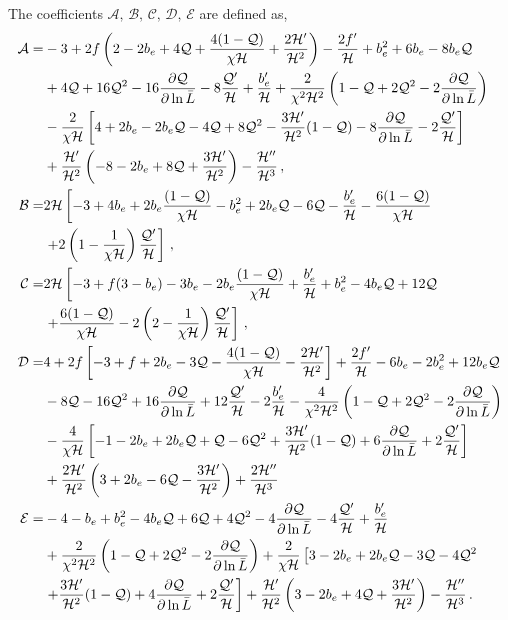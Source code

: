 The coefficients $\mathcal{A},\,\mathcal{B},\,\mathcal{C},\,\mathcal{D},\,\mathcal{E}$ are defined as, 
\begin{align}
	\mathcal{A} =& -3 + 2f \left(2 - 2b_e + 4 \mathcal{Q} + \frac{4(1-\mathcal{Q})}{\chi\mathcal{H}} + \frac{2\mathcal{H}'}{\mathcal{H}^{2}} \right) -\frac{2f'}{\mathcal{H}} + b_e^2 + 6 b_e - 8 b_e \mathcal{Q} \nonumber \\
	& + 4 \mathcal{Q} + 16 \mathcal{Q}^2 - 16\frac{\partial \mathcal{Q}}{\partial \ln\bar{L}} -8 \frac{\mathcal{Q}'}{\mathcal{H}} + \frac{b_e'}{\mathcal{H}} + \frac{2}{\chi^{2}\mathcal{H}^2} \left(1 - \mathcal{Q} + 2\mathcal{Q}^2 - 2\frac{\partial \mathcal{Q}}{\partial \ln{\bar{L}}} \right) \nonumber \\
	& - \frac{2}{\chi \mathcal{H}} \left[ 4 + 2b_e - 2 b_e \mathcal{Q} - 4\mathcal{Q} + 8\mathcal{Q}^2 - \frac{3\mathcal{H}'}{\mathcal{H}^2}(1 - \mathcal{Q}) - 8\frac{\partial \mathcal{Q}}{\partial \ln{\bar{L}}} - 2\frac{\mathcal{Q}'}{\mathcal{H}} \right] \nonumber \\
	& + \frac{\mathcal{H}'}{\mathcal{H}^2} \left(-8 - 2b_e + 8\mathcal{Q} + \frac{3\mathcal{H}'}{\mathcal{H}^2} \right) - \frac{\mathcal{H}''}{\mathcal{H}^3}\,,\label{eq:bcA} \\
	\mathcal{B} =& 2\mathcal{H} \left[ -3 + 4 b_e + 2b_e \frac{(1 - \mathcal{Q})}{\chi \mathcal{H}} -b_e^2 + 2b_e \mathcal{Q} - 6\mathcal{Q} - \frac{b_e'}{\mathcal{H}} - \frac{6( 1 - \mathcal{Q})}{\chi\mathcal{H}} \right. \nonumber \\
	& \left. + 2\left(1 - \frac{1}{\chi\mathcal{H}} \right) \frac{\mathcal{Q}'}{\mathcal{H}} \right]\,,\\
	\mathcal{C} =& 2\mathcal{H} \left[ -3 + f(3 - b_e) - 3b_e - 2 b_e \frac{(1 - \mathcal{Q})}{\chi\mathcal{H}} + \frac{b_e'}{\mathcal{H}} + b_e^2 - 4 b_e \mathcal{Q} + 12\mathcal{Q} \right. \nonumber \\
	&\left. + \frac{6 (1 - \mathcal{Q})}{\chi\mathcal{H}} - 2\left(2 -\frac{1}{\chi\mathcal{H}}\right) \frac{\mathcal{Q}'}{\mathcal{H}} \right]\,\label{eq:bcC}, \\
	\mathcal{D} =& 4 +2f\left[ -3 + f + 2b_e - 3\mathcal{Q} - \frac{4(1 - \mathcal{Q})}{\chi\mathcal{H}} - \frac{2\mathcal{H}'}{\mathcal{H}^2} \right] +\frac{2f'}{\mathcal{H}} - 6b_e - 2 b_e^2 + 12 b_e\mathcal{Q} \nonumber \\
	& - 8 \mathcal{Q} - 16\mathcal{Q}^2 + 16 \frac{\partial \mathcal{Q}}{\partial \ln{\bar{L}}} + 12 \frac{\mathcal{Q}'}{\mathcal{H}} - 2\frac{b_e'}{\mathcal{H}} - \frac{4}{\chi^2 \mathcal{H}^2} \left(1 - \mathcal{Q} + 2\mathcal{Q}^2 - 2 \frac{\partial \mathcal{Q}}{\partial \ln{\bar{L}}} \right) \nonumber \\
	& - \frac{4}{\chi \mathcal{H}} \left[ -1 -2b_e + 2b_e\mathcal{Q} + \mathcal{Q} - 6\mathcal{Q}^2 + \frac{3\mathcal{H}'}{\mathcal{H}^2}(1 - \mathcal{Q}) + 6 \frac{\partial \mathcal{Q}}{\partial \ln{\bar{L}}} + 2\frac{\mathcal{Q}'}{\mathcal{H}} \right] \nonumber \\
	&+ \frac{2\mathcal{H}'}{\mathcal{H}^2} \left(3 + 2b_e - 6\mathcal{Q} - \frac{3\mathcal{H}'}{\mathcal{H}^2} \right) + \frac{2\mathcal{H}''}{\mathcal{H}^3} \\
	\mathcal{E} =& -4 - b_e + b_e^2 - 4b_e\mathcal{Q} + 6 \mathcal{Q} + 4\mathcal{Q}^2 - 4\frac{\partial \mathcal{Q}}{\partial \ln{\bar{L}}} - 4\frac{\mathcal{Q}'}{\mathcal{H}} + \frac{b_e'}{\mathcal{H}} \nonumber \\
	&+ \frac{2}{\chi^2\mathcal{H}^2} \left(1 - \mathcal{Q} + 2\mathcal{Q}^2 - 2\frac{\partial \mathcal{Q}}{\partial \ln{\bar{L}}}\right) + \frac{2}{\chi\mathcal{H}} \left[3 - 2b_e + 2b_e \mathcal{Q} - 3\mathcal{Q} - 4\mathcal{Q}^2 \right. \nonumber \\
	&\left. + \frac{3\mathcal{H}'}{\mathcal{H}^2} (1 - \mathcal{Q}) + 4\frac{\partial \mathcal{Q}}{\partial \ln{\bar{L}}} + 2\frac{\mathcal{Q}'}{\mathcal{H}} \right] + \frac{\mathcal{H}'}{\mathcal{H}^2} \left(3 - 2b_e + 4\mathcal{Q} + \frac{3\mathcal{H}'}{\mathcal{H}^2} \right) - \frac{\mathcal{H}''}{\mathcal{H}^3}\,.
\end{align}
